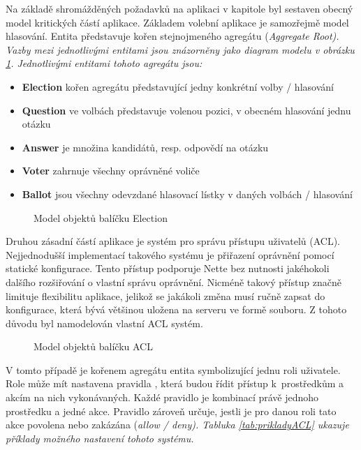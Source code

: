 Na základě shromážděných požadavků na aplikaci v kapitole  byl sestaven obecný model kritických částí aplikace. Základem volební aplikace je samozřejmě model hlasování. Entita  představuje kořen stejnojmeného agregátu (\it{Aggregate Root}). Vazby mezi jednotlivými entitami jsou znázorněny jako diagram modelu v obrázku \ref{fig:ElectionModel}. Jednotlivými entitami tohoto agregátu jsou: 
\begin{itemize}
	\item \textbf{Election} kořen agregátu představující jedny konkrétní volby / hlasování
	\item \textbf{Question} ve volbách představuje volenou pozici, v obecném hlasování jednu otázku
	\item \textbf{Answer} je množina kandidátů, resp. odpovědí na otázku
	\item \textbf{Voter} zahrnuje všechny oprávněné voliče
	\item \textbf{Ballot} jsou všechny odevzdané hlasovací lístky v daných volbách / hlasování
\end{itemize}

\begin{figure}[h]
		\centering \tiny {}\selectfont
		\def\svgwidth{0.5\columnwidth}
		
		\normalsize \sffamily
		\captionsetup{width=\linewidth}
		\caption{Model objektů balíčku Election}
		\label{fig:ElectionModel}
\end{figure}
\clearpage

Druhou zásadní částí aplikace je systém pro správu přístupu uživatelů (ACL). Nejjednodušší implementací takového systému je přiřazení oprávnění pomocí statické konfigurace. Tento přístup podporuje Nette bez nutnosti jakéhokoli dalšího rozšiřování o vlastní správu oprávnění. Nicméně takový přístup značně limituje flexibilitu aplikace, jelikož se jakákoli změna musí ručně zapsat do konfigurace, která bývá většinou uložena na serveru ve formě souboru. Z tohoto důvodu byl namodelován vlastní ACL systém.

\begin{figure}[h]
		\centering \tiny {}\selectfont
		\def\svgwidth{0.6\columnwidth}
		
		\normalsize \sffamily
		\captionsetup{width=\linewidth}
		\caption{Model objektů balíčku ACL}
		\label{fig:AclModel}
\end{figure}

V tomto případě je kořenem agregátu entita  symbolizující jednu roli uživatele. Role může mít nastavena pravidla , která budou řídit přístup k~prostředkům  a akcím  na nich vykonávaných. Každé pravidlo je kombinací právě jednoho prostředku a jedné akce. Pravidlo zároveň určuje, jestli je pro danou roli tato akce povolena nebo zakázána (\it{allow / deny}). Tabluka \ref{tab:prikladyACL} ukazuje příklady možného nastavení tohoto systému.


